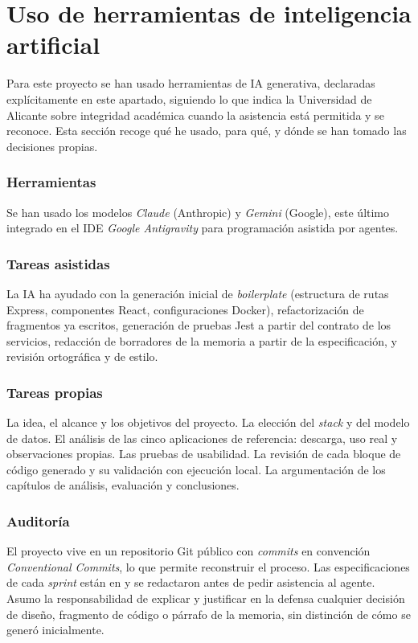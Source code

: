 \section{Uso de herramientas de inteligencia artificial}
\label{sec:uso-ia}

Para este proyecto se han usado herramientas de IA generativa, declaradas explícitamente en este apartado, siguiendo lo que indica la Universidad de Alicante sobre integridad académica cuando la asistencia está permitida y se reconoce. Esta sección recoge qué he usado, para qué, y dónde se han tomado las decisiones propias.

\subsubsection*{Herramientas}
  Se han usado los modelos \textit{Claude} (Anthropic) y \textit{Gemini} (Google), este último integrado en el IDE \textit{Google Antigravity} para programación asistida por agentes.

\subsubsection*{Tareas asistidas}
  La IA ha ayudado con la generación inicial de \textit{boilerplate} (estructura de rutas Express, componentes React, configuraciones Docker), refactorización de fragmentos ya escritos, generación de pruebas Jest a partir del contrato de los servicios, redacción de borradores de la memoria a partir de la especificación, y revisión ortográfica y de estilo.

\subsubsection*{Tareas propias}
  La idea, el alcance y los objetivos del proyecto. La elección del \textit{stack} y del modelo de datos. El análisis de las cinco aplicaciones de referencia: descarga, uso real y observaciones propias. Las pruebas de usabilidad. La revisión de cada bloque de código generado y su validación con ejecución local. La argumentación de los capítulos de análisis, evaluación y conclusiones.

\subsubsection*{Auditoría}
  El proyecto vive en un repositorio Git público con \textit{commits} en convención \textit{Conventional Commits}, lo que permite reconstruir el proceso. Las especificaciones de cada \textit{sprint} están en  y se redactaron antes de pedir asistencia al agente. Asumo la responsabilidad de explicar y justificar en la defensa cualquier decisión de diseño, fragmento de código o párrafo de la memoria, sin distinción de cómo se generó inicialmente.

